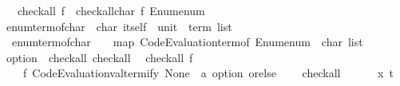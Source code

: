 \begin{isabellebody}
\ \ \ {\isachardoublequoteopen}check{\isacharunderscore}{\kern0pt}all\ f\ {\isacharequal}{\kern0pt}\ check{\isacharunderscore}{\kern0pt}all{\isacharunderscore}{\kern0pt}char{\isacharprime}{\kern0pt}\ f\ Enum{\isachardot}{\kern0pt}enum{\isachardoublequoteclose}\isanewline
\isanewline
{}\isamarkupfalse%
\ enum{\isacharunderscore}{\kern0pt}term{\isacharunderscore}{\kern0pt}of{\isacharunderscore}{\kern0pt}char\ {\isacharcolon}{\kern0pt}{\isacharcolon}{\kern0pt}\ {\isachardoublequoteopen}char\ itself\ {\isasymRightarrow}\ unit\ {\isasymRightarrow}\ term\ list{\isachardoublequoteclose}\isanewline
{}\isanewline
\ \ {\isachardoublequoteopen}enum{\isacharunderscore}{\kern0pt}term{\isacharunderscore}{\kern0pt}of{\isacharunderscore}{\kern0pt}char\ {\isacharequal}{\kern0pt}\ {\isacharparenleft}{\kern0pt}{\isasymlambda}{\isacharunderscore}{\kern0pt}\ {\isacharunderscore}{\kern0pt}{\isachardot}{\kern0pt}\ map\ Code{\isacharunderscore}{\kern0pt}Evaluation{\isachardot}{\kern0pt}term{\isacharunderscore}{\kern0pt}of\ {\isacharparenleft}{\kern0pt}Enum{\isachardot}{\kern0pt}enum\ {\isacharcolon}{\kern0pt}{\isacharcolon}{\kern0pt}\ char\ list{\isacharparenright}{\kern0pt}{\isacharparenright}{\kern0pt}{\isachardoublequoteclose}\isanewline
\isanewline
{}\isamarkupfalse%
%
\isadelimproof
\ %
\endisadelimproof
%
\isatagproof
\isacommand{{\isachardot}{\kern0pt}{\isachardot}{\kern0pt}}\isamarkupfalse%
%
\endisatagproof
{\isafoldproof}%
%
\isadelimproof
%
\endisadelimproof
\isanewline
\isanewline
{}\isamarkupfalse%
\isanewline
\isanewline
{}\isamarkupfalse%
\ option\ {\isacharcolon}{\kern0pt}{\isacharcolon}{\kern0pt}\ {\isacharparenleft}{\kern0pt}check{\isacharunderscore}{\kern0pt}all{\isacharparenright}{\kern0pt}\ check{\isacharunderscore}{\kern0pt}all\isanewline
{}\isanewline
\isanewline
{}\isamarkupfalse%
\isanewline
\ \ {\isachardoublequoteopen}check{\isacharunderscore}{\kern0pt}all\ f\ {\isacharequal}{\kern0pt}\isanewline
\ \ \ \ f\ {\isacharparenleft}{\kern0pt}Code{\isacharunderscore}{\kern0pt}Evaluation{\isachardot}{\kern0pt}valtermify\ {\isacharparenleft}{\kern0pt}None\ {\isacharcolon}{\kern0pt}{\isacharcolon}{\kern0pt}\ {\isacharprime}{\kern0pt}a\ option{\isacharparenright}{\kern0pt}{\isacharparenright}{\kern0pt}\ orelse\isanewline
\ \ \ \ check{\isacharunderscore}{\kern0pt}all\isanewline
\ \ \ \ \ \ {\isacharparenleft}{\kern0pt}{\isasymlambda}{\isacharparenleft}{\kern0pt}x{\isacharcomma}{\kern0pt}\ t{\isacharparenright}{\kern0pt}{\isachardot}{\kern0pt}\isanewline

\end{isabellebody}
